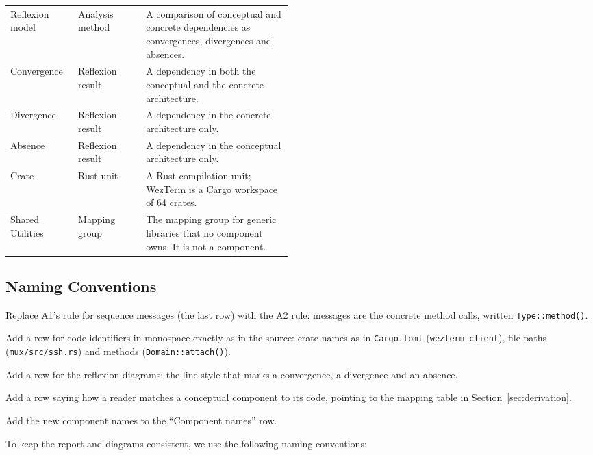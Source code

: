 \begin{table}[!htbp]
\begin{tabularx}{\linewidth}{@{}>{\raggedright\arraybackslash}p{0.24\linewidth}>{\raggedright\arraybackslash}p{0.24\linewidth}X@{}}
    Reflexion model & Analysis method & A comparison of conceptual and concrete dependencies as convergences, divergences and absences. \\
    Convergence & Reflexion result & A dependency in both the conceptual and the concrete architecture. \\
    Divergence & Reflexion result & A dependency in the concrete architecture only. \\
    Absence & Reflexion result & A dependency in the conceptual architecture only. \\
    Crate & Rust unit & A Rust compilation unit; WezTerm is a Cargo workspace of 64 crates. \\
    Shared Utilities & Mapping group & The mapping group for generic libraries that no component owns. It is not a component. \\
    \bottomrule
  \end{tabularx}
\end{table}

\subsection{Naming Conventions}
\label{sec:naming-conventions}

\begin{requirements}
  \item Replace A1's rule for sequence messages (the last row) with the A2 rule: messages are the concrete method calls, written \texttt{Type::method()}.
  \item Add a row for code identifiers in monospace exactly as in the source: crate names as in \texttt{Cargo.toml} (\texttt{wezterm-client}), file paths (\texttt{mux/src/ssh.rs}) and methods (\texttt{Domain::attach()}).
  \item Add a row for the reflexion diagrams: the line style that marks a convergence, a divergence and an absence.
  \item Add a row saying how a reader matches a conceptual component to its code, pointing to the mapping table in Section~\ref{sec:derivation}.
  \item Add the new component names to the ``Component names'' row.
\end{requirements}

To keep the report and diagrams consistent, we use the following naming conventions:

